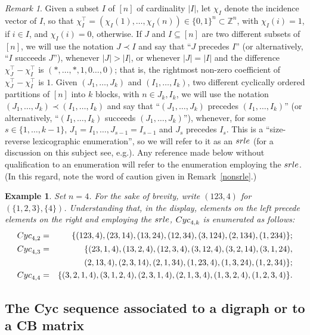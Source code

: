 \documentclass[10pt]{amsart}
\newcommand{\eg}{e.g.}
\newcommand{\mbz}{\mbox{$\mathbb{Z}$}}
\newcommand{\cyc}{\mbox{${\rm Cyc}$}}
\newcommand{\srle}{\mbox{${\rm srle}$}}
\newtheorem{example}[cdrthm]{Example}
\theoremstyle{definition}
\theoremstyle{remark}
\newtheorem{remark}[cdrthm]{Remark}
\begin{document}
\begin{remark}\label{srle}
Given a subset $I$ of $[n]$ of cardinality $\lvert I\rvert$, let
$\chi_I$ denote the incidence vector of $I$, so that
$\chi_I^{\top}=(\chi_{I}(1),\ldots ,\chi_{I}(n))\in \{0,1\}^n\subset
\mbz^n$, with $\chi_I(i)=1$, if $i\in I$, and $\chi_I(i)=0$,
otherwise.  If $J$ and $I\subseteq [n]$ are two different subsets of
$[n]$, we will use the notation $J\prec I$ and say that ``$J$ precedes
$I$'' (or alternatively, ``$I$ succeeds $J$''), whenever $\lvert
J\rvert >\lvert I\rvert$, or whenever $\lvert J\rvert=\lvert I\rvert$
and the difference $\chi_J^{\top}-\chi_I^{\top}$ is $(*,\ldots
,*,1,0\ldots ,0)$; that is, the rightmost non-zero coefficient of
$\chi_J^{\top}-\chi_I^{\top}$ is $1$.  Given $(J_1,\ldots ,J_k)$ and
$(I_1,\ldots ,I_k)$, two different cyclically ordered partitions of
$[n]$ into $k$ blocks, with $n\in J_k,I_k$, we will use the notation
$(J_1,\ldots ,J_k)\prec (I_1,\ldots ,I_k)$ and say that ``$(J_1,\ldots
,J_k)$ precedes $(I_1,\ldots ,I_k)$'' (or alternatively,
``$(I_1,\ldots ,I_k)$ succeeds $(J_1,\ldots ,J_k)$''), whenever, for
some $s\in\{1,\ldots ,k-1\}$, $J_1=I_1,\ldots ,J_{s-1}=I_{s-1}$ and
$J_{s}$ precedes $I_s$. This is a ``size-reverse lexicographic
enumeration'', so we will refer to it as an $\srle$ (for a discussion
on this subject see, \eg \cite{lhs}). Any reference made below
without qualification to an enumeration will refer to the enumeration
employing the $\srle$. (In this regard, note the word of caution
given in Remark~\ref{nonsrle}.)
\end{remark}

\begin{example}\label{srlen=4}
Set $n=4$. For the sake of brevity, write $(123,4)$ for
$(\{1,2,3\},\{4\})$.  Understanding that, in the display, elements on
the left precede elements on the right and employing the $\srle$,
$\cyc_{4,k}$ is enumerated as follows:
\begin{eqnarray*}
\cyc_{4,2}&=&\{(123,4),(23,14),(13,24),(12,34),(3,124),(2,134),(1,234)\};\\ 
\cyc_{4,3}&=&\{(23,1,4),(13,2,4),(12,3,4),(3,12,4),(3,2,14),(3,1,24),\\ 
&\mbox{ }&(2,13,4),(2,3,14),(2,1,34),(1,23,4),(1,3,24),(1,2,34)\};\\ 
\cyc_{4,4}&=&\{(3,2,1,4),(3,1,2,4),(2,3,1,4),(2,1,3,4),(1,3,2,4),
(1,2,3,4)\}.
\end{eqnarray*}
\end{example}

\subsection{The Cyc sequence associated to a digraph or to a CB matrix}
\end{document}
